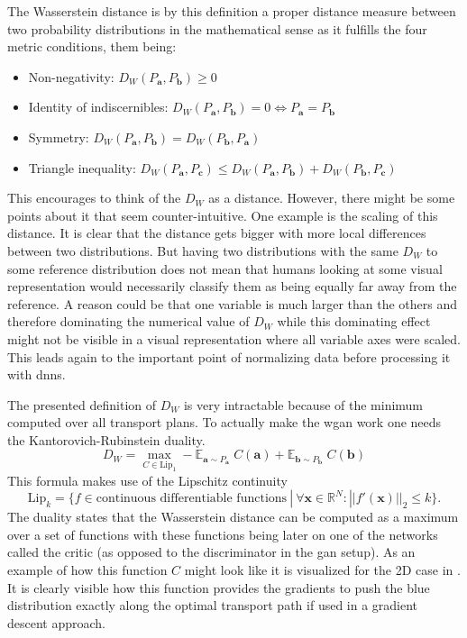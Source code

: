 The Wasserstein distance is by this definition a proper distance measure between two probability distributions in the mathematical sense as it fulfills the four metric conditions, them being:
\begin{itemize}
\item Non-negativity: \(D_W(P_{\bm a}, P_{\bm b}) \geq 0\)
\item Identity of indiscernibles: \(D_W(P_{\bm a}, P_{\bm b}) = 0 \Leftrightarrow P_{\bm a} = P_{\bm b}\)
\item Symmetry: \(D_W(P_{\bm a}, P_{\bm b}) = D_W(P_{\bm b}, P_{\bm a})\)
\item Triangle inequality: \(D_W(P_{\bm a}, P_{\bm c}) \leq D_W(P_{\bm a}, P_{\bm b}) + D_W(P_{\bm b}, P_{\bm c})\)
\end{itemize}
This encourages to think of the \(D_W\) as a distance. However, there might be some points about it that seem counter-intuitive. One example is the scaling of this distance. It is clear that the distance gets bigger with more local differences between two distributions. But having two distributions with the same \(D_W\) to some reference distribution does not mean that humans looking at some visual representation would necessarily classify them as being equally far away from the reference. A reason could be that one variable is much larger than the others and therefore dominating the numerical value of \(D_W\) while this dominating effect might not be visible in a visual representation where all variable axes were scaled. This leads again to the important point of normalizing data before processing it with \glspl{dnn}.

The presented definition of \(D_W\) is very intractable because of the minimum computed over all transport plans. To actually make the \gls{wgan} work one needs the Kantorovich-Rubinstein duality. \begin{equation}
    D_W = \max_{C \in \text{Lip}_1} - \mathbb{E}_{\bm a \sim P_{\bm a}}\; C(\bm a) + \mathbb{E}_{\bm b \sim P_{\bm b}}\; C(\bm b)
\end{equation}
This formula makes use of the Lipschitz continuity
\begin{equation}
    \text{Lip}_k = \{f \in \text{continuous differentiable functions} \ |\  \forall \bm x \in \mathbb{R}^N : ||f'(\bm x)||_2 \leq k\}.
\end{equation}
The duality states that the Wasserstein distance can be computed as a maximum over a set of functions with these functions being later on one of the networks called the critic (as opposed to the discriminator in the \gls{gan} setup). As an example of how this function \(C\) might look like it is visualized for the 2D case in . It is clearly visible how this function provides the gradients to push the blue distribution exactly along the optimal transport path if used in a gradient descent approach.


